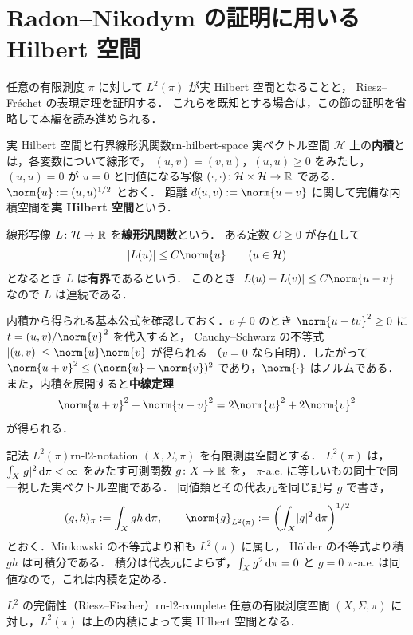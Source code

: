 \section{Radon--Nikodym の証明に用いる Hilbert 空間}

任意の有限測度 $\pi$ に対して $L^2(\pi)$ が実 Hilbert 空間となることと，
Riesz--Fréchet の表現定理を証明する．
これらを既知とする場合は，この節の証明を省略して本編を読み進められる．

\begin{definition}{実 Hilbert 空間と有界線形汎関数}{rn-hilbert-space}
  実ベクトル空間 $\mathcal{H}$ 上の\textbf{内積}とは，各変数について線形で，
  $(u,v)=(v,u)$，$(u,u)\geq0$ をみたし，
  $(u,u)=0$ が $u=0$ と同値になる写像
  $(\cdot,\cdot)\colon\mathcal{H}\times\mathcal{H}\to\mathbb{R}$ である．
  $\norm{u}:=(u,u)^{1/2}$ とおく．
  距離 $d(u,v):=\norm{u-v}$ に関して完備な内積空間を\textbf{実 Hilbert 空間}という．

  線形写像 $L\colon\mathcal{H}\to\mathbb{R}$ を\textbf{線形汎関数}という．
  ある定数 $C\geq0$ が存在して
  \[
    \abs{L(u)}\leq C\norm{u}\qquad(u\in\mathcal{H})
  \]
  となるとき $L$ は\textbf{有界}であるという．
  このとき $\abs{L(u)-L(v)}\leq C\norm{u-v}$ なので $L$ は連続である．
\end{definition}

内積から得られる基本公式を確認しておく．$v\neq0$ のとき
$\norm{u-tv}^2\geq0$ に $t=(u,v)/\norm{v}^2$ を代入すると，
Cauchy--Schwarz の不等式 $\abs{(u,v)}\leq\norm{u}\norm{v}$ が得られる
（$v=0$ なら自明）．したがって
$\norm{u+v}^2\leq(\norm{u}+\norm{v})^2$ であり，$\norm{\cdot}$ はノルムである．
また，内積を展開すると\textbf{中線定理}
\[
  \norm{u+v}^2+\norm{u-v}^2=2\norm{u}^2+2\norm{v}^2
\]
が得られる．

\begin{remark}{記法 $L^2(\pi)$}{rn-l2-notation}
  $(X,\Sigma,\pi)$ を有限測度空間とする．
  $L^2(\pi)$ は，$\int_X\lvert g \rvert^2\,\mathrm{d}\pi<\infty$ をみたす可測関数 $g\colon X\to\mathbb{R}$ を，
  $\pi$-a.e. に等しいもの同士で同一視した実ベクトル空間である．
  同値類とその代表元を同じ記号 $g$ で書き，
  \[
    (g,h)_\pi:=\int_Xgh\,\d\pi,\qquad
    \norm{g}_{L^2(\pi)}:=\left(\int_X\abs{g}^2\,\d\pi\right)^{1/2}
  \]
  とおく．Minkowski の不等式より和も $L^2(\pi)$ に属し，
  Hölder の不等式より積 $gh$ は可積分である．
  積分は代表元によらず，$\int_Xg^2\,\mathrm{d}\pi=0$ と $g=0$ $\pi$-a.e. は同値なので，これは内積を定める．
\end{remark}

\begin{lemma}{$L^2$ の完備性（Riesz--Fischer）}{rn-l2-complete}
  任意の有限測度空間 $(X,\Sigma,\pi)$ に対し，$L^2(\pi)$ は上の内積によって実 Hilbert 空間となる．
\end{lemma}


